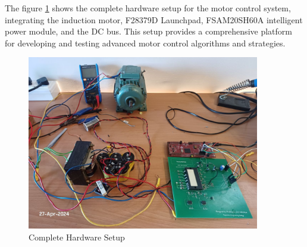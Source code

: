 
The figure \ref{fig:Complete Hardware Setup} shows the complete hardware setup for the motor control system, integrating the induction motor, F28379D Launchpad, FSAM20SH60A intelligent power module, and the DC bus. This setup provides a comprehensive platform for developing and testing advanced motor control algorithms and strategies.

\begin{figure}[H]
	\centering
	\includegraphics[width=4in]{sections/section6/images/hardwareSetup/fullSetupWithMotorAndIPM.jpg}
	\caption{Complete Hardware Setup}
	\label{fig:Complete Hardware Setup}
\end{figure}


\newpage